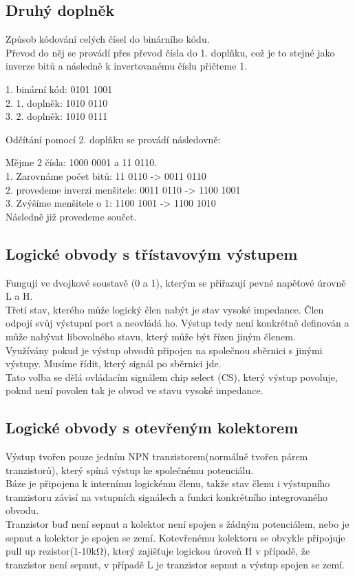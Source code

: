 \subsection{Druhý doplněk}
Způsob kódování celých čísel do binárního kódu. \\
Převod do něj se provádí přes převod čísla do 1. doplňku, což je to stejné jako inverze bitů a následně k invertovanému číslu přičteme 1.
\begin{center}
    1. binární kód: 0101 1001\\
    2. 1. doplněk:  1010 0110\\
    3. 2. doplněk:  1010 0111\\
\end{center}
Odčítání pomocí 2. doplňku se provádí následovně:
\begin{center}
    Mějme 2 čísla: 1000 0001 a 11 0110.\\
    1. Zarovnáme počet bitů: 11 0110 -> 0011 0110\\
    2. provedeme inverzi menšitele: 0011 0110 -> 1100 1001\\
    3. Zvýšíme menšitele o 1: 1100 1001 -> 1100 1010\\
    Následně již provedeme součet.
\end{center}
\subsection{Logické obvody s třístavovým výstupem}
Fungují ve dvojkové soustavě (0 a 1), kterým se přiřazují pevné napěťové úrovně L a H.\\
Třetí stav, kterého může logický člen nabýt je stav vysoké impedance. Člen odpojí svůj výstupní port a neovládá ho. Výstup tedy není konkrétně definován a může nabývat libovolného stavu, který může být řízen jiným členem.\\
Využívány pokud je výstup obvodů připojen na společnou sběrnici s jinými výstupy. Musíme řídit, který signál po sběrnici jde.\\
Tato volba se dělá ovládacím signálem chip select (CS), který výstup povoluje, pokud není povolen tak je obvod ve stavu vysoké impedance.\\

\subsection{Logické obvody s otevřeným kolektorem}
Výstup tvořen pouze jedním NPN tranzistorem(normálně tvořen párem tranzistorů), který spíná výstup ke společnému potenciálu. \\
Báze je připojena k internímu logickému členu, takže stav členu i výstupního tranzistoru závisí na vstupních signálech a funkci konkrétního integrovaného obvodu. \\
Tranzistor buď není sepnut a kolektor není spojen s žádným potenciálem, nebo je sepnut a kolektor je spojen se zemí. Kotevřenému kolektoru se obvykle připojuje pull up rezistor(1-10kΩ), který zajišťuje logickou úroveň H v případě, že tranzistor není sepnut, v případě L je tranzistor sepnut a výstup spojen se zemí.

